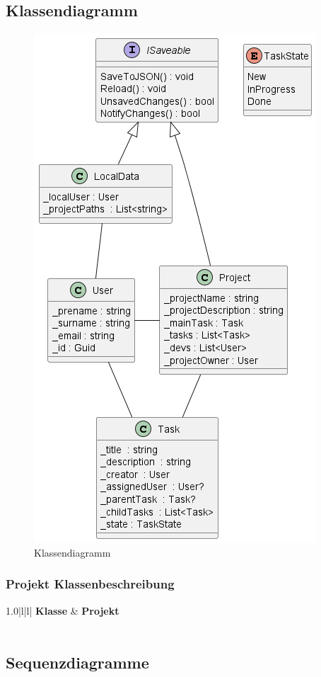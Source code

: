 \subsection{Klassendiagramm}
\begin{figure}[H]
  \begin{center}
    \includegraphics[width=0.5\linewidth]{../content/diagrams/class/classDiagram/classDiagram.png}
    \caption{Klassendiagramm}
  \end{center}
\end{figure}
\subsubsection{Projekt Klassenbeschreibung}
\begin{table}[H]
  \centering
  \settowidth{}
  \setlength\extrarowheight{2pt}
  \begin{tabulary}{1.0\textwidth}{|l|l|}
    \hline
    \textbf{Klasse} &
    \textbf{Projekt}\\
    \hline
    \\
    \hline
  \end{tabulary}
  \caption{Klassenbeschreibung: Projekt}
\end{table}


\newpage
\subsection{Sequenzdiagramme}
